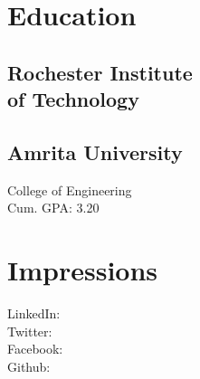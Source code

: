 \documentclass[]{bigfatnoob-resume}
\begin{document}
%
%
\lastupdated

%
%

%
%

\begin{minipage}[t]{0.33\textwidth} 


\section{Education} 

\subsection{Rochester Institute \\ of Technology}
\sectionsep

\subsection{Amrita University}
College of Engineering \\ Cum. GPA: 3.20 
\sectionsep


\section{Impressions} 
LinkedIn: \href{https://www.linkedin.com/in/sandeepmohan777}{} \\
Twitter: \href{https://twitter.com/msandy57}{} \\
Facebook: \href{https://www.facebook.com/sandeepmohan777}{}\\
Github: \href{https://www.github.com/msandy57}{}
\sectionsep


\end{minipage}
\end{document}
